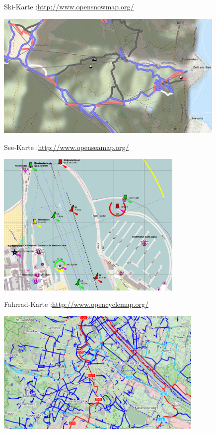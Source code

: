 \documentclass[handout]{beamer}
\begin{document}
\hypersetup{urlcolor=cyan}

\begin{frame}{Ski-Karte :\hfill\url{http://www.opensnowmap.org/}}
\begin{center}
\includegraphics[height=6.1cm]{style-snow.png}
\end{center}
\end{frame}

\begin{frame}{See-Karte :\hfill\url{http://www.openseamap.org/}}
\begin{center}
\includegraphics[height=7cm]{style-seamap.png}
\end{center}
\end{frame}

\begin{frame}{Fahrrad-Karte :\hfill\url{http://www.opencyclemap.org/}}
\begin{center}
\includegraphics[height=6cm]{style-cycle.png}
\end{center}
\end{frame}
\end{document}
